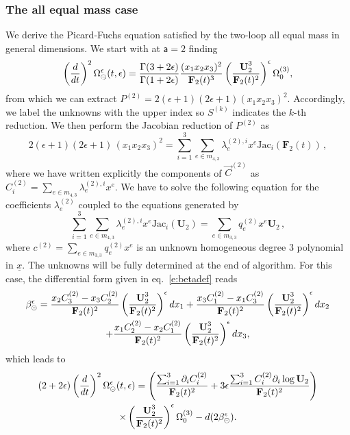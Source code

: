 \documentclass[a4paper,12pt]{article}
\numberwithin{equation}{section}
\numberwithin{figure}{section}
\def\su{\circleddash}
\begin{document}
\subsubsection{The all equal mass case}\label{sec:2sunset1mass}
We derive the Picard-Fuchs equation satisfied by the two-loop all
equal mass in general dimensions. 
We  start with at $\mathsf{a}=2$ finding
\begin{equation}
 \left(d\over dt\right)^2
 \Omega_{\su}^{\epsilon}(t,\epsilon)={\Gamma(3+2\epsilon)\over\Gamma(1+2\epsilon)} {(x_1x_2x_3)^2\over \textbf{F}_2(t)^3}
 \left(\textbf{U}_2^3\over \textbf{F}_2(t)^2\right)^\epsilon  \Omega_0^{(3)} ,
\end{equation}
from which we can extract $P^{(2)}=2 (\epsilon +1) (2 \epsilon +1)(x_1x_2x_3)^2$. 
%
Accordingly, we label the unknowns with the upper index so $S^{(k)}$ indicates the $k$-th reduction. We then  perform the Jacobian reduction of $P^{(2)}$ as
\begin{equation}\label{e:reduc}
  2 (\epsilon +1) (2 \epsilon +1)\,  (x_1x_2x_3)^2= \sum_{i=1}^3 
  \sum_{e\in m_{4,3}}\lambda^{(2),i}_{e} x^e \text{Jac}_i  (\mathbf{F}_2(t)) \,,
\end{equation}
%
where we have written explicitly the components of $\vec{C}^{(2)}$ as $C^{(2)}_i=\sum_{e\in m_{4,3}}\lambda^{(2),i}_{e} x^e$.
We have to solve the following equation for the coefficients $\lambda_e^{(2)}$ coupled to the equations generated by
\begin{equation}\label{e:C2red}
\sum_{i=1}^3 
\sum_{e\in m_{4,3}}\lambda^{(2),i}_{e} x^e \text{Jac}_i(\mathbf U_2) = \sum_{e\in m_{3,3}} q^{(2)}_e x^e \textbf{U}_2 \,, 
%
\end{equation}
where $c^{(2)}=\sum_{e\in m_{3,3}} q^{(2)}_e x^e$ is an unknown homogeneous degree 3 polynomial
in $\underline x$.
%
The unknowns will be fully determined at the end of  algorithm. For this case, 
the differential form given in eq.~\eqref{e:betadef} reads
%
 \begin{multline}
 	\label{eq:beta-equalmass-sunset}
   \beta_\su^\epsilon=   {x_2  C_3^{(2)}-x_3  C_2^{(2)}\over
     \textbf{F}_2(t)^2} \left(\textbf{U}_2^3\over \textbf{F}_2(t)^2\right)^\epsilon dx_1+   {x_3  C_1^{(2)}-x_1 C_3^{(2)}\over
     \textbf{F}_2(t)^2} \left(\textbf{U}_2^3\over \textbf{F}_2(t)^2\right)^\epsilon dx_2\cr
   +  {x_1  C_2^{(2)}-x_2  C_1^{(2)}\over
    \textbf{F}_2(t)^2} \left(\textbf{U}_2^3\over \textbf{F}_2(t)^2\right)^\epsilon dx_3, 
 \end{multline}
which leads to 
%
\begin{multline}
 (2+2\epsilon)\left(d\over dt\right)^2
  \Omega_{\su}^{\epsilon}(t,\epsilon)=
 \left({\sum_{i=1}^3 \partial_i C_i^{(2)}\over
     \textbf{F}_2(t)^{2}}+3\epsilon{\sum_{i=1}^3 C_i^{(2)}\partial_i
     \log \textbf{U}_2\over \textbf{F}_2(t)^{2}}\right)\cr \times\left(\textbf{U}_2^3\over \textbf{F}_2(t)^2\right)^\epsilon \Omega_0^{(3)}-d(2\beta_\su^\epsilon).
\end{multline}
\end{document}
